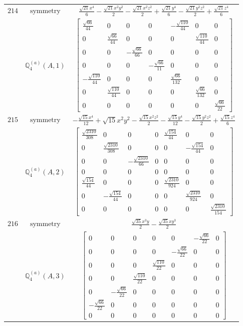 \documentclass[fleqn,8pt,landscape]{jsarticle}
\begin{document}
\begin{longtable}{ccc}
$ 214 $ & $ \text{symmetry} $ & $ \frac{\sqrt{21} x^{4}}{6} - \frac{\sqrt{21} x^{2} y^{2}}{2} - \frac{\sqrt{21} x^{2} z^{2}}{2} + \frac{\sqrt{21} y^{4}}{6} - \frac{\sqrt{21} y^{2} z^{2}}{2} + \frac{\sqrt{21} z^{4}}{6} $ \\
$  $ & $ \mathbb{Q}_{4}^{(a)}(A,1) $ & $ \begin{bmatrix} \frac{\sqrt{66}}{44} & 0 & 0 & 0 & - \frac{\sqrt{110}}{44} & 0 & 0 \\ 0 & \frac{\sqrt{66}}{44} & 0 & 0 & 0 & \frac{\sqrt{110}}{44} & 0 \\ 0 & 0 & - \frac{\sqrt{66}}{66} & 0 & 0 & 0 & 0 \\ 0 & 0 & 0 & - \frac{\sqrt{66}}{11} & 0 & 0 & 0 \\ - \frac{\sqrt{110}}{44} & 0 & 0 & 0 & \frac{\sqrt{66}}{132} & 0 & 0 \\ 0 & \frac{\sqrt{110}}{44} & 0 & 0 & 0 & \frac{\sqrt{66}}{132} & 0 \\ 0 & 0 & 0 & 0 & 0 & 0 & \frac{\sqrt{66}}{22} \end{bmatrix} $ \\ \hline
$ 215 $ & $ \text{symmetry} $ & $ - \frac{\sqrt{15} x^{4}}{12} + \sqrt{15} x^{2} y^{2} - \frac{\sqrt{15} x^{2} z^{2}}{2} - \frac{\sqrt{15} y^{4}}{12} - \frac{\sqrt{15} y^{2} z^{2}}{2} + \frac{\sqrt{15} z^{4}}{6} $ \\
$  $ & $ \mathbb{Q}_{4}^{(a)}(A,2) $ & $ \begin{bmatrix} \frac{\sqrt{2310}}{308} & 0 & 0 & 0 & \frac{\sqrt{154}}{44} & 0 & 0 \\ 0 & \frac{\sqrt{2310}}{308} & 0 & 0 & 0 & - \frac{\sqrt{154}}{44} & 0 \\ 0 & 0 & - \frac{\sqrt{2310}}{66} & 0 & 0 & 0 & 0 \\ 0 & 0 & 0 & 0 & 0 & 0 & 0 \\ \frac{\sqrt{154}}{44} & 0 & 0 & 0 & \frac{\sqrt{2310}}{924} & 0 & 0 \\ 0 & - \frac{\sqrt{154}}{44} & 0 & 0 & 0 & \frac{\sqrt{2310}}{924} & 0 \\ 0 & 0 & 0 & 0 & 0 & 0 & \frac{\sqrt{2310}}{154} \end{bmatrix} $ \\ \hline
$ 216 $ & $ \text{symmetry} $ & $ \frac{\sqrt{35} x^{3} y}{2} - \frac{\sqrt{35} x y^{3}}{2} $ \\
$  $ & $ \mathbb{Q}_{4}^{(a)}(A,3) $ & $ \begin{bmatrix} 0 & 0 & 0 & 0 & 0 & - \frac{\sqrt{66}}{22} & 0 \\ 0 & 0 & 0 & 0 & - \frac{\sqrt{66}}{22} & 0 & 0 \\ 0 & 0 & 0 & \frac{\sqrt{110}}{22} & 0 & 0 & 0 \\ 0 & 0 & \frac{\sqrt{110}}{22} & 0 & 0 & 0 & 0 \\ 0 & - \frac{\sqrt{66}}{22} & 0 & 0 & 0 & 0 & 0 \\ - \frac{\sqrt{66}}{22} & 0 & 0 & 0 & 0 & 0 & 0 \\ 0 & 0 & 0 & 0 & 0 & 0 & 0 \end{bmatrix} $ \\ \hline

\end{longtable}
\end{document}
